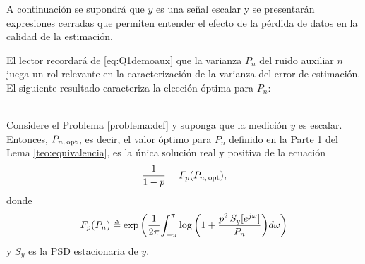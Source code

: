 A continuaci\'on se supondr\'a que $y$ es una se\~nal escalar y se presentar\'an expresiones cerradas que permiten entender el efecto de la p\'erdida de datos en la calidad de la estimaci\'on.

El lector recordar\'a de \eqref{eq:Q1demoaux} que la varianza $P_n$ del ruido auxiliar $n$ juega un rol relevante en la caracterizaci\'on de la varianza del error de estimaci\'on. El siguiente resultado caracteriza la elecci\'on \'optima para $P_n$:
\begin{teo}\label{teo:yescalar}{\ \\}
Considere el Problema \ref{problema:def} y suponga que la medici\'on $y$ es escalar. Entonces, $P_{n,\,\operatorname{opt}}$, es decir, el valor óptimo para $P_n$ definido en la Parte 1 del Lema \ref{teo:equivalencia}, es la \'unica soluci\'on real y positiva de la ecuaci\'on
\begin{align}\label{eq:condicion-sigma-q}
\frac{1}{1-p} = F_p(P_{n, \, \operatorname{opt}}),
\end{align}
donde
\begin{align}
F_p(P_{n}) \triangleq \exp{\left(  \frac{1}{2\pi}\!\int_{-\pi}^{\pi}  \log{\left( 1 + \frac{p^2\, S_y[e^{j\omega}]}{ P_{n} } \right)}  d\omega  \right)}
\end{align}
y $S_y$ es la PSD estacionaria de $y$.
\end{teo}

